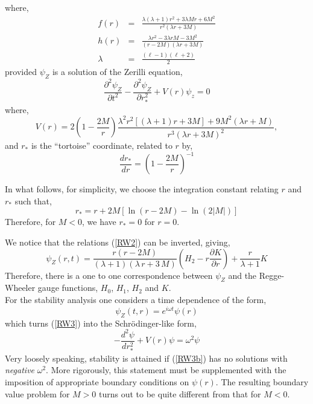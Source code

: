 \documentclass[12pt,aps,floats,showpacs,amssymb,tightenlines]{revtex4}
\begin{document}
where,
\begin{eqnarray}
\label{RW2a}
f(r) & = &  \frac{\lambda(\lambda+1)r^2+3 \lambda M r + 6 M^2}{r^2(\lambda r + 3 M)}\nonumber \\
h(r) & = &  \frac{\lambda r^2 - 3 \lambda r M -3 M^2}{(r-2M)(\lambda r + 3M)}\nonumber \\
\lambda & = &  \frac{(\ell-1)(\ell+2)}{2}
\end{eqnarray}
provided $\psi_Z$ is a solution of the Zerilli equation,
\begin{equation}
\label{RW3}
\frac{\partial^2 \psi_Z}{\partial t^2}-\frac{\partial^2 \psi_Z}{\partial r_*^2} +V(r) \psi_z = 0
\end{equation}
where,
\begin{equation}
\label{poten1}
V(r) = 2 \left(1 -\frac{2 M}{ r}\right) {\frac{ \lambda^2 r^2
\left[(\lambda+1) r + 3 M \right] + 9 M^2 (\lambda r +M)}{ r^3
(\lambda r + 3 M)^2} } ,
\end{equation}
and $r_*$ is the ``tortoise'' coordinate, related to $r$ by,
\begin{equation}
\label{RW4}
\frac{dr_*}{dr}=\left(1-\frac{2M}{r}\right)^{-1}
\end{equation}

In what follows, for simplicity, we choose the integration constant relating $r$ and $r_*$ such that,
\begin{equation}
\label{RW4a}
r_* = r +2 M \left[\ln (r-2M) -\ln(2|M|)\right]
\end{equation}
Therefore, for $M<0$, we have $ r_*=0$ for $r=0$.

We notice that the relations (\ref{RW2}) can be inverted, giving,
\begin{equation}
\label{RW3a}
\psi_Z(r,t)  = \frac {r (r-2M)}{ ( \lambda+1 )  ( \lambda
\,r+3\,M ) } \left(H_2
 - r  \frac {\partial K}{\partial r}
\right)
    +\frac{r}{\lambda+1} K
\end{equation}
Therefore, there is a one to one correspondence between $\psi_Z$ and
the Regge-Wheeler gauge functions, $H_0$, $H_1$, $H_2$ and $K$.\\

For the stability analysis one considers a time dependence of the form,
\begin{equation}
\label{psitopsi1}
\psi_Z(t,r)=e^{i \omega t} \psi(r)
\end{equation}
which turns (\ref{RW3}) into the Schr\"odinger-like form,
\begin{equation}
\label{RW3b}
 -\frac{d^2 \psi}{d r_*^2} +V(r) \psi = \omega^2  \psi
\end{equation}
Very loosely speaking, stability is attained if (\ref{RW3b}) has no solutions with {\em negative}
 $\omega^2$. More rigorously, this statement must be supplemented with the imposition of appropriate
 boundary conditions on $\psi(r)$. The resulting boundary value problem for $M > 0$ turns out to be
  quite different from that for $M<0$.
\end{document}
